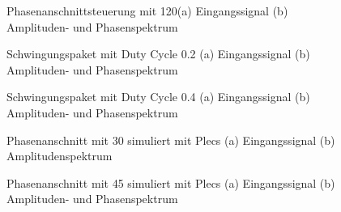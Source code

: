 \begin{appendix}
\begin{figure}[ht!]
	\centering
	\qquad
	\caption{Phasenanschnittsteuerung mit 120\textdegree (a) Eingangssignal (b) Amplituden- und Phasenspektrum}
	\label{fig:Phasenanschnittsteuerung_mit_120}
\end{figure}

\newpage

\begin{figure}[ht!]
	\centering
	\qquad
	\caption{Schwingungspaket mit Duty Cycle 0.2 (a) Eingangssignal (b) Amplituden- und Phasenspektrum}
	\label{fig:Schwingungspaketsteuerung_mit_duty_cycle_0_2}
\end{figure}


\begin{figure}[ht!]
	\centering
	\qquad
	\caption{Schwingungspaket mit Duty Cycle 0.4 (a) Eingangssignal (b) Amplituden- und Phasenspektrum}
	\label{fig:Schwingungspaketsteuerung_mit_duty_cycle_0_4}
\end{figure}

\begin{figure}[ht!]
	\centering
	\qquad
	\caption{Phasenanschnitt mit 30\textdegree \hspace{0.02cm} simuliert mit Plecs (a) Eingangssignal (b) Amplitudenspektrum}
	\label{fig:Plecs_mit_phasenanschnitt_30}
\end{figure}

\newpage

\begin{figure}[ht!]
	\centering
	\qquad
	\caption{Phasenanschnitt mit 45\textdegree \hspace{0.02cm} simuliert mit Plecs (a) Eingangssignal (b) Amplituden- und Phasenspektrum}
	\label{fig:Plecs_mit_phasenanschnitt_45}
\end{figure}



\end{appendix}
